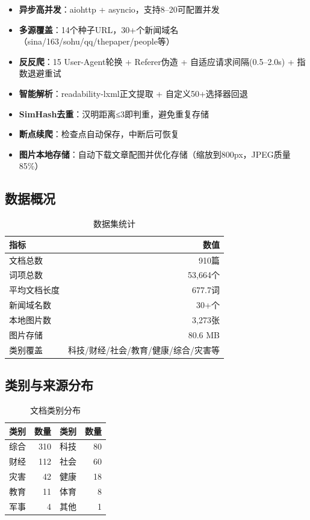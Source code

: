 \documentclass[12pt,a4paper]{ctexart}
\begin{document}
\begin{itemize}
    \item \textbf{异步高并发}：aiohttp + asyncio，支持8--20可配置并发
    \item \textbf{多源覆盖}：14个种子URL，30+个新闻域名（sina/163/sohu/qq/thepaper/people等）
    \item \textbf{反反爬}：15 User-Agent轮换 + Referer伪造 + 自适应请求间隔(0.5--2.0s) + 指数退避重试
    \item \textbf{智能解析}：readability-lxml正文提取 + 自定义50+选择器回退
    \item \textbf{SimHash去重}：汉明距离≤3即判重，避免重复存储
    \item \textbf{断点续爬}：检查点自动保存，中断后可恢复
    \item \textbf{图片本地存储}：自动下载文章配图并优化存储（缩放到800px，JPEG质量85\%）
\end{itemize}

\subsection{数据概况}

\begin{table}[h]
\centering
\caption{数据集统计}
\begin{tabular}{lr}
\toprule
指标 & 数值 \\
\midrule
文档总数 & 910篇 \\
词项总数 & 53,664个 \\
平均文档长度 & 677.7词 \\
新闻域名数 & 30+个 \\
本地图片数 & 3,273张 \\
图片存储 & 80.6 MB \\
类别覆盖 & 科技/财经/社会/教育/健康/综合/灾害等 \\
\midrule
\end{tabular}
\end{table}

\subsection{类别与来源分布}

\begin{table}[h]
\centering
\caption{文档类别分布}
\begin{tabular}{lr|lr}
\toprule
类别 & 数量 & 类别 & 数量 \\
\midrule
综合 & 310 & 科技 & 80 \\
财经 & 112 & 社会 & 60 \\
灾害 & 42 & 健康 & 18 \\
教育 & 11 & 体育 & 8 \\
军事 & 4 & 其他 & 1 \\
\bottomrule
\end{tabular}
\end{table}
\end{document}
